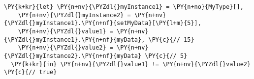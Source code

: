 \begin{Verbatim}[commandchars=\\\{\}]
\PY{k+kr}{let} \PY{n+nv}{\PYZdl{}myInstance1} = \PY{n+no}{MyType}[],
    \PY{n+nv}{\PYZdl{}myInstance2} = \PY{n+nv}{\PYZdl{}myInstance1}.\PY{n+nf}{setMyData}[\PY{l+m}{5}],
    \PY{n+nv}{\PYZdl{}value1} = \PY{n+nv}{\PYZdl{}myInstance1}.\PY{n+nf}{myData}, \PY{c}{// 15}
    \PY{n+nv}{\PYZdl{}value2} = \PY{n+nv}{\PYZdl{}myInstance2}.\PY{n+nf}{myData} \PY{c}{// 5}
  \PY{k+kr}{in} \PY{n+nv}{\PYZdl{}value1} != \PY{n+nv}{\PYZdl{}value2} \PY{c}{// true}
\end{Verbatim}
